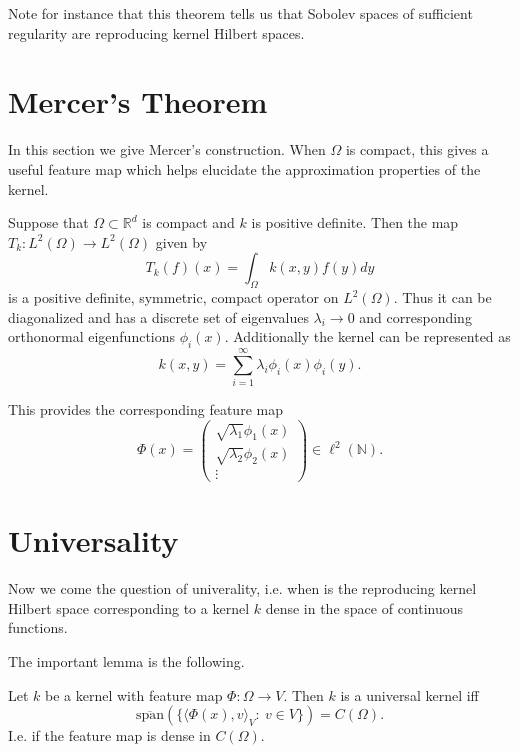 Note for instance that this theorem tells us that Sobolev spaces of sufficient regularity are reproducing kernel Hilbert spaces. 

\section{Mercer's Theorem}
In this section we give Mercer's construction. When $\Omega$ is compact, this gives a useful feature map which helps elucidate the approximation properties of the kernel.

Suppose that $\Omega\subset \mathbb{R}^d$ is compact and $k$ is positive definite. Then the map $T_k:L^2(\Omega)\rightarrow L^2(\Omega)$ given by
\begin{equation}
 T_k(f)(x) = \int_\Omega k(x,y)f(y)dy
\end{equation}
is a positive definite, symmetric, compact operator on $L^2(\Omega)$. Thus it can be diagonalized and has a discrete set of eigenvalues $\lambda_i\rightarrow 0$ and corresponding orthonormal eigenfunctions $\phi_i(x)$. Additionally the kernel can be represented as
\begin{equation}
 k(x,y) = \sum_{i=1}^\infty \lambda_i\phi_i(x)\phi_i(y).
\end{equation}

This provides the corresponding feature map
\begin{equation}
 \Phi(x) = \begin{pmatrix}
            \sqrt{\lambda_1}\phi_1(x) \\
            \sqrt{\lambda_2}\phi_2(x) \\
            \vdots
           \end{pmatrix}\in \ell^2(\mathbb{N}).
\end{equation}


\section{Universality}
Now we come the question of univerality, i.e. when is the reproducing kernel Hilbert space corresponding to a kernel $k$ dense in the space of continuous functions.

The important lemma is the following.
\begin{lemma}
 Let $k$ be a kernel with feature map $\Phi:\Omega\rightarrow V$. Then $k$ is a universal kernel iff
 \begin{equation}
  \overline{\text{span}}(\{\langle \Phi(x), v\rangle_V:~v\in V\}) = C(\Omega).
 \end{equation}
 I.e. if the feature map is dense in $C(\Omega)$.
\end{lemma}


